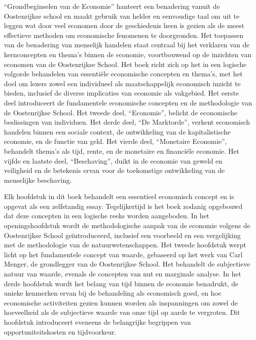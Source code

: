 ``Grondbeginselen van de Economie'' hanteert een benadering vanuit de Oostenrijkse school en maakt gebruik van helder en eenvoudige taal om uit te leggen wat door veel economen door de geschiedenis heen is gezien als de meest effectieve methoden om economische fenomenen te doorgronden. Het toepassen van de benadering van menselijk handelen staat centraal bij het verklaren van de kernconcepten en thema's binnen de economie, voortbouwend op de inzichten van economen van de Oostenrijkse School. Het boek richt zich op het in een logische volgorde behandelen van essentiële economische concepten en thema's, met het doel om lezers zowel een individueel als maatschappelijk economisch inzicht te bieden, inclusief de diverse implicaties van economie als vakgebied. Het eerste deel introduceert de fundamentele economische concepten en de methodologie van de Oostenrijkse School. Het tweede deel, ``Economie'', belicht de economische beslissingen van individuen. Het derde deel, ``De Marktorde'', verkent economisch handelen binnen een sociale context, de ontwikkeling van de kapitalistische economie, en de functie van geld. Het vierde deel, ``Monetaire Economie'', behandelt thema's als tijd, rente, en de monetaire en financiële economie. Het vijfde en laatste deel, ``Beschaving'', duikt in de economie van geweld en veiligheid en de betekenis ervan voor de toekomstige ontwikkeling van de menselijke beschaving.

Elk hoofdstuk in dit boek behandelt een essentieel economisch concept en is opgevat als een zelfstandig essay. Tegelijkertijd is het boek zodanig opgebouwd dat deze concepten in een logische reeks worden aangeboden. In het openingshoofdstuk wordt de methodologische aanpak van de economie volgens de Oostenrijkse School geïntroduceerd, inclusief een voorbeeld en een vergelijking met de methodologie van de natuurwetenschappen. Het tweede hoofdstuk werpt licht op het fundamentele concept van waarde, gebaseerd op het werk van Carl Menger, de grondlegger van de Oostenrijkse School. Het behandelt de subjectieve natuur van waarde, evenals de concepten van nut en marginale analyse. In het derde hoofdstuk wordt het belang van tijd binnen de economie benadrukt, de unieke kenmerken ervan bij de behandeling als economisch goed, en hoe economische activiteiten gezien kunnen worden als inspanningen om zowel de hoeveelheid als de subjectieve waarde van onze tijd op aarde te vergroten. Dit hoofdstuk introduceert eveneens de belangrijke begrippen van opportuniteitskosten en tijdvoorkeur.

